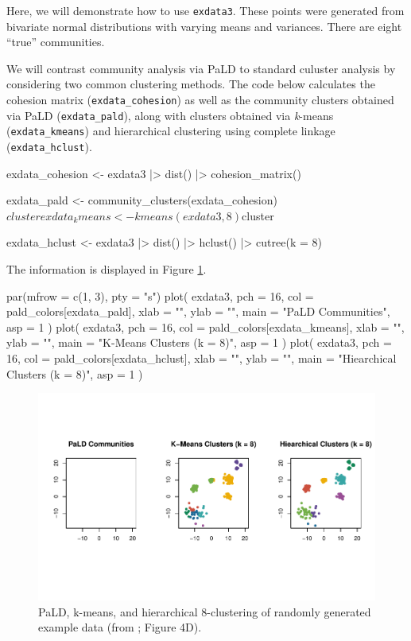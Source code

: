 Here, we will demonstrate how to use \texttt{exdata3}. These points were
generated from bivariate normal distributions with varying means and
variances. There are eight ``true'' communities.

We will contrast community analysis via PaLD to standard culuster
analysis by considering two common clustering methods. The code below
calculates the cohesion matrix (\texttt{exdata\_cohesion}) as well as
the community clusters obtained via PaLD (\texttt{exdata\_pald}), along
with clusters obtained via \emph{k}-means (\texttt{exdata\_kmeans}) and
hierarchical clustering using complete linkage
(\texttt{exdata\_hclust}).

\begin{Schunk}
\begin{Sinput}
exdata_cohesion <- exdata3 |>
  dist() |>
  cohesion_matrix()

exdata_pald <- community_clusters(exdata_cohesion)$cluster

exdata_kmeans <- kmeans(exdata3, 8)$cluster

exdata_hclust <- exdata3 |>
  dist() |>
  hclust() |>
  cutree(k = 8) 
\end{Sinput}
\end{Schunk}

The information is displayed in Figure \ref{fig:fig5}.

\begin{Schunk}
\begin{Sinput}
par(mfrow = c(1, 3), pty = "s")
plot(
  exdata3,
  pch = 16,
  col = pald_colors[exdata_pald],
  xlab = "",
  ylab = "",
  main = "PaLD Communities",
  asp = 1
)
plot(
  exdata3,
  pch = 16,
  col = pald_colors[exdata_kmeans],
  xlab = "",
  ylab = "",
  main = "K-Means Clusters (k = 8)",
  asp = 1
)
plot(
  exdata3,
  pch = 16,
  col = pald_colors[exdata_hclust],
  xlab = "",
  ylab = "",
  main = "Hiearchical Clusters (k = 8)",
  asp = 1
)
\end{Sinput}
\begin{figure}
\includegraphics{dagostino-mcgowan_files/figure-latex/fig5-1} \caption[PaLD, k-means, and hierarchical 8-clustering of randomly generated example data (from \citet{berenhaut2022social}]{PaLD, k-means, and hierarchical 8-clustering of randomly generated example data (from \citet{berenhaut2022social}; Figure 4D).}\label{fig:fig5}
\end{figure}
\end{Schunk}

